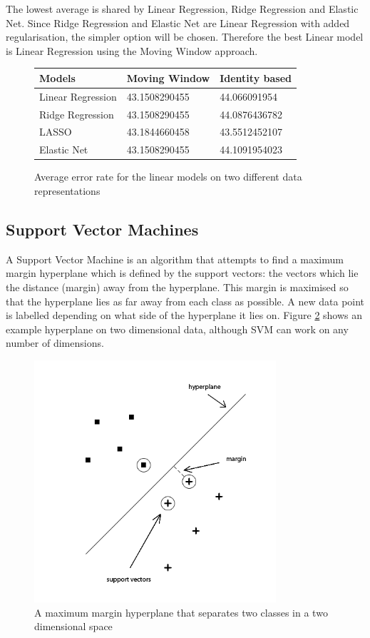 The lowest average is shared by Linear Regression, Ridge Regression and Elastic Net. Since Ridge Regression and Elastic Net are Linear Regression with added regularisation, the simpler option will be chosen. Therefore the best Linear model is Linear Regression using the Moving Window approach.

\begin{figure}[h!]
\centering
\begin{tabular}{l || l | l}
Models & Moving Window & Identity based \\ \hline \hline
Linear Regression & 43.1508290455 & 44.066091954 \\ \hline
Ridge Regression & 43.1508290455 & 44.0876436782 \\ \hline
LASSO & 43.1844660458 & 43.5512452107 \\ \hline
Elastic Net & 43.1508290455 & 44.1091954023 \\ \hline
\end{tabular}
\caption{Average error rate for the linear models on two different data representations}
\label{table:linearmodelsaverages}
\end{figure}

\subsection{Support Vector Machines}
A Support Vector Machine is an algorithm that attempts to find a maximum margin hyperplane which is defined by the support vectors: the vectors which lie the distance (margin) away from the hyperplane. This margin is maximised so that the hyperplane lies as far away from each class as possible. A new data point is labelled depending on what side of the hyperplane it lies on. Figure \ref{fig:hyperplane} shows an example hyperplane on two dimensional data, although SVM can work on any number of dimensions.

\begin{figure}[h!]
\centering
\includegraphics[width=0.8\textwidth]{images/hyperplane.png}
\caption{A maximum margin hyperplane that separates two classes in a two dimensional space}
\label{fig:hyperplane}
\end{figure}

